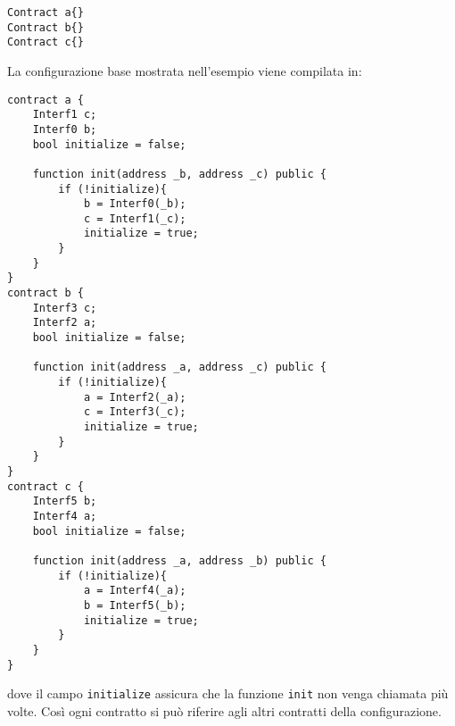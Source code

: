 \documentclass[]{article}
\begin{document}
\begin{verbatim}
Contract a{}
Contract b{}
Contract c{}
\end{verbatim}

La configurazione base mostrata nell'esempio viene compilata in:

\begin{verbatim}
contract a {
    Interf1 c;
    Interf0 b;
    bool initialize = false;
    
    function init(address _b, address _c) public {
        if (!initialize){
            b = Interf0(_b);
            c = Interf1(_c);
            initialize = true;
        }
    }
}
contract b {
    Interf3 c;
    Interf2 a;
    bool initialize = false;
    
    function init(address _a, address _c) public {
        if (!initialize){
            a = Interf2(_a);
            c = Interf3(_c);
            initialize = true;
        }
    }
}
contract c {
    Interf5 b;
    Interf4 a;
    bool initialize = false;

    function init(address _a, address _b) public {
        if (!initialize){
            a = Interf4(_a);
            b = Interf5(_b);
            initialize = true;
        }
    }
}
\end{verbatim}

dove il campo \texttt{initialize} assicura che la funzione \texttt{init}
non venga chiamata più volte. Così ogni contratto si può riferire agli
altri contratti della configurazione.
\end{document}
